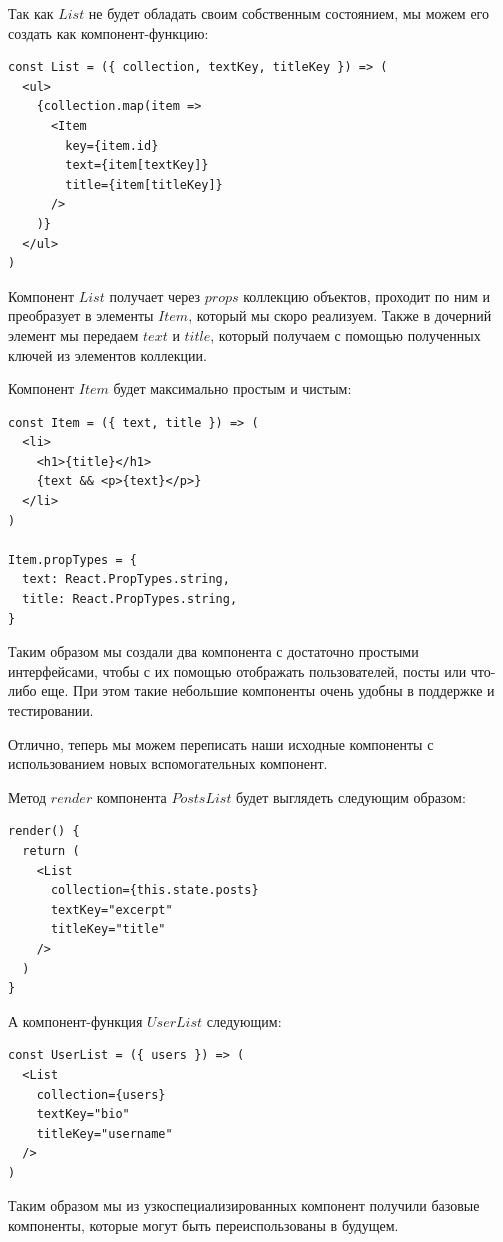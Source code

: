 Так как $List$ не будет обладать своим собственным состоянием, мы можем его создать как компонент-функцию:

\begin{lstlisting}
const List = ({ collection, textKey, titleKey }) => (
  <ul>
    {collection.map(item =>
      <Item
        key={item.id}
        text={item[textKey]}
        title={item[titleKey]}
      /> 
    )}
  </ul> 
)
\end{lstlisting}

Компонент $List$ получает через $props$ коллекцию объектов, проходит по ним и преобразует в элементы $Item$, который мы скоро реализуем. Также в дочерний элемент мы передаем $text$ и $title$, который получаем с помощью полученных ключей из элементов коллекции.

Компонент $Item$ будет максимально простым и чистым:

\begin{lstlisting}
const Item = ({ text, title }) => (
  <li>
    <h1>{title}</h1>
    {text && <p>{text}</p>}
  </li>
)

Item.propTypes = {
  text: React.PropTypes.string,
  title: React.PropTypes.string,
}
\end{lstlisting}

Таким образом мы создали два компонента с достаточно простыми интерфейсами, чтобы с их помощью отображать пользователей, посты или что-либо еще. При этом такие небольшие компоненты очень удобны в поддержке и тестировании.

Отлично, теперь мы можем переписать наши исходные компоненты с использованием новых вспомогательных компонент.

Метод $render$ компонента $PostsList$ будет выглядеть следующим образом:

\begin{lstlisting}
render() {
  return (
    <List
      collection={this.state.posts}
      textKey="excerpt"
      titleKey="title"
    />
  )
}
\end{lstlisting}

А компонент-функция $UserList$ следующим:

\begin{lstlisting}
const UserList = ({ users }) => (
  <List
    collection={users}
    textKey="bio"
    titleKey="username"
  /> 
)
\end{lstlisting}

Таким образом мы из узкоспециализированных компонент получили базовые компоненты, которые могут быть переиспользованы в будущем.


